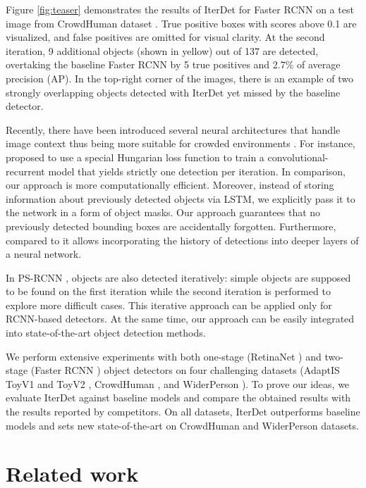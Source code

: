 \documentclass[runningheads]{llncs}
\begin{document}
Figure \ref{fig:teaser} demonstrates the results of IterDet for Faster RCNN \cite{ren2015faster} on a test image from CrowdHuman dataset \cite{shao2018crowdhuman}. True positive boxes with scores above 0.1 are visualized, and false positives are omitted for visual clarity. At the second iteration, 9 additional objects (shown in yellow) out of 137 are detected, overtaking the baseline Faster RCNN by 5 true positives and 2.7\% of average precision (AP). In the top-right corner of the images, there is an example of two strongly overlapping objects detected with IterDet yet missed by the baseline detector.

Recently, there have been introduced several neural architectures that handle image context thus being more suitable for crowded environments \cite{hu2018relation,goldman2019precise,ge2020ps}. For instance, \cite{stewart2016end} proposed to use a special Hungarian loss function to train a convolutional-recurrent model that yields strictly one detection per iteration. In comparison, our approach is more computationally efficient. Moreover, instead of storing information about previously detected objects via LSTM, we explicitly pass it to the network in a form of object masks. Our approach guarantees that no previously detected bounding boxes are accidentally forgotten. Furthermore, compared to \cite{stewart2016end} it allows incorporating the history of detections into deeper layers of a neural network. 

In PS-RCNN \cite{ge2020ps}, objects are also detected iteratively: simple objects are supposed to be found on the first iteration while the second iteration is performed to explore more difficult cases. This iterative approach can be applied only for RCNN-based detectors. At the same time, our approach can be easily integrated into state-of-the-art object detection methods.

We perform extensive experiments with both one-stage (RetinaNet \cite{lin2017focal}) and two-stage (Faster RCNN \cite{ren2015faster}) object detectors on four challenging datasets (AdaptIS ToyV1 and ToyV2 \cite{sofiiuk2019adaptis}, CrowdHuman \cite{shao2018crowdhuman}, and WiderPerson \cite{zhang2019widerperson}). To prove our ideas, we evaluate IterDet against baseline models and compare the obtained results with the results reported by competitors. On all datasets, IterDet outperforms baseline models and sets new state-of-the-art on CrowdHuman and WiderPerson datasets.

\section{Related work}
\label{sec:related}
\end{document}
